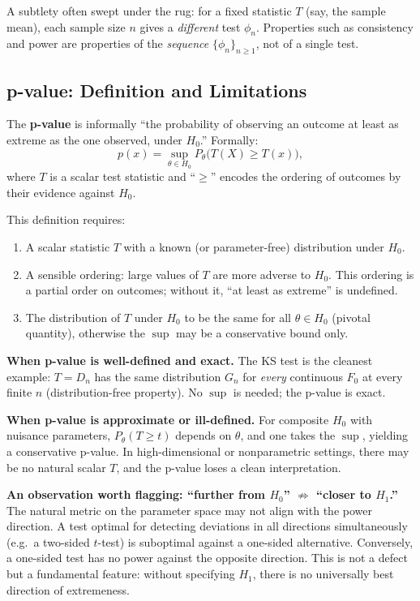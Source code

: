 \documentclass[11pt, a4paper]{article}
\begin{document}
A subtlety often swept under the rug: for a fixed statistic $T$ (say, the sample mean),
each sample size $n$ gives a \emph{different} test $\phi_n$. Properties such as
consistency and power are properties of the \emph{sequence} $\{\phi_n\}_{n\geq 1}$,
not of a single test.

\subsection{p-value: Definition and Limitations}

The \textbf{p-value} is informally ``the probability of observing an outcome at least as
extreme as the one observed, under $H_0$.'' Formally:
\[
  p(x) = \sup_{\theta\in H_0} P_\theta\bigl(T(X) \geq T(x)\bigr),
\]
where $T$ is a scalar test statistic and ``$\geq$'' encodes the ordering of outcomes
by their evidence against $H_0$.

This definition requires:
\begin{enumerate}[label=(\roman*)]
  \item A scalar statistic $T$ with a known (or parameter-free) distribution under $H_0$.
  \item A sensible ordering: large values of $T$ are more adverse to $H_0$.
        This ordering is a partial order on outcomes; without it, ``at least as extreme''
        is undefined.
  \item The distribution of $T$ under $H_0$ to be the same for all $\theta\in H_0$
        (pivotal quantity), otherwise the $\sup$ may be a conservative bound only.
\end{enumerate}

\textbf{When p-value is well-defined and exact.}
The KS test is the cleanest example: $T = D_n$ has the same distribution $G_n$ for
\emph{every} continuous $F_0$ at every finite $n$ (distribution-free property).
No $\sup$ is needed; the p-value is exact.

\textbf{When p-value is approximate or ill-defined.}
For composite $H_0$ with nuisance parameters, $P_\theta(T \geq t)$ depends on $\theta$,
and one takes the $\sup$, yielding a conservative p-value.
In high-dimensional or nonparametric settings, there may be no natural scalar $T$,
and the p-value loses a clean interpretation.

\textbf{An observation worth flagging: ``further from $H_0$'' $\not\Rightarrow$ ``closer to $H_1$.''}
The natural metric on the parameter space may not align with the power direction.
A test optimal for detecting deviations in all directions simultaneously (e.g.\ a
two-sided $t$-test) is suboptimal against a one-sided alternative.
Conversely, a one-sided test has no power against the opposite direction.
This is not a defect but a fundamental feature: without specifying $H_1$, there is no
universally best direction of extremeness.
\end{document}
